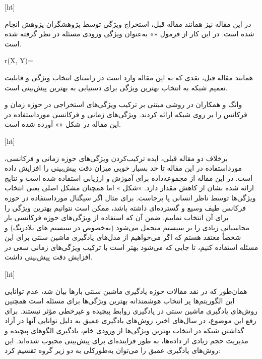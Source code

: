 [ht]

در این مقاله نیز همانند مقاله قبل، استخراج ویژگی توسط پژوهشگران پژوهش انجام شده است. در این کار از فرمول «» به‌عنوان ویژگی ورودی مسئله در نظر گرفته شده است.


r(X, Y)=


همانند مقاله قبل، نقدی که به این مقاله وارد است در راستای انتخاب ویژگی و قابلیت تعمیم شبکه به انتخاب بهترین ويژگی برای دستیابی به بهترین پیش‌بینی است.



وانگ و همکاران در  روشی مبتنی بر ترکیب ویژگی‌های استخراجی در حوزه زمان و فرکانس را بر روی شبکه  ارائه کردند. ویژگی‌های زمانی و فرکانسی مورداستفاده در این مقاله در شکل «» آورده شده است.


[ht]

برخلاف دو مقاله قبلی، ایده ترکیب‌کردن ویژگی‌های حوزه زمانی و فرکانسی، مورداستفاده در این مقاله تا حد بسیار خوبی میزان دقت پیش‌بینی را افزایش داده است. در این مقاله از مجموعه‌داده  برای آموزش و ارزیابی استفاده شده است و نتایج ارائه شده نشان از کاهش مقدار  دارد. «شکل » اما همچنان مشکل اصلی یعنی انتخاب ویژگی‌ها توسط ناظر انسانی پا برجاست. برای مثال اگر سیگنال مورداستفاده در حوزه فرکانس طیف وسیع و گسترده‌ای داشته باشد، ممکن است نتوانیم بهترین ویژگی را برای آن انتخاب نماییم. ضمن آن که استفاده از ویژگی‌های حوزه فرکانسی بار محاسباتی زیادی را بر سیستم متحمل می‌شود (به‌خصوص در سیستم های بلادرنگ) و شخصاً معتقد هستم که اگر می‌خواهیم از مدل‌های یادگیری ماشین سنتی برای این مسئله استفاده کنیم، تا جایی که می‌شود بهتر است با ترکیب ویژگی‌های زمانی سعی در افزایش دقت پیش‌بینی داشت.




[ht]







همان‌طور که در نقد مقالات حوزه یادگیری ماشین سنتی بارها بیان شد، عدم توانایی این الگوریتم‌ها پر انتخاب هوشمندانه بهترین ویژگی‌ها برای مسئله است همچنین روش‌های یادگیری ماشین سنتی در یادگیری روابط پیچیده و غیرخطی مؤثر نیستند. برای رفع این موضوع، در سال‌های اخیر، روش‌های یادگیری عمیق به دلیل توانایی آنها در آزاد گذاشتن شبکه در انتخاب بهترین ویژگی‌ها از ورودی خام، یادگیری الگوهای پیچیده و مدیریت حجم زیادی از داده‌ها، به طور فزاینده‌ای برای پیش‌بینی  محبوب شده‌اند. این روش‌های یادگیری عمیق را می‌توان به‌طورکلی به دو زیر گروه تقسیم کرد:

